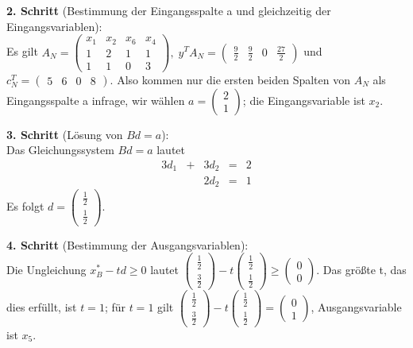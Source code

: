 \documentclass[10pt,a4paper,oneside,ngerman,numbers=noenddot]{scrartcl}
\begin{document}
		\textbf{2. Schritt} (Bestimmung der Eingangsspalte a und gleichzeitig der Eingangsvariablen):\\
		Es gilt $A_{N} = \begin{pmatrix} x_{1} & x_{2} & x_{6} & x_{4} \\ 1 & 2 & 1 & 1 \\ 1 & 1 & 0 & 3 \end{pmatrix},\; y^{T}A_{N} = \begin{pmatrix} \frac{9}{2} & \frac{9}{2} & 0 & \frac{27}{2} \end{pmatrix}$ und $c_{N}^{T} = \begin{pmatrix} 5 & 6 & 0 & 8 \end{pmatrix}$. Also kommen nur die ersten beiden Spalten von $A_{N}$ als Eingangsspalte a infrage, wir wählen $a = \begin{pmatrix} 2 \\ 1 \end{pmatrix}$; die Eingangsvariable ist $x_{2}$.
		
		\textbf{3. Schritt} (Lösung von $Bd = a$):\\
		Das Gleichungssystem $Bd = a$ lautet
		\begin{alignat*}{3}
			d_{1} &+& 3d_{2} &=& 2 \\
			&& 2d_{2} &=& 1
		\end{alignat*}
		Es folgt $d = \begin{pmatrix}\frac{1}{2} \\ \frac{1}{2}\end{pmatrix}$.
		
		\textbf{4. Schritt} (Bestimmung der Ausgangsvariablen):\\
		Die Ungleichung $x_{B}^{*} - td \geq 0$ lautet $\begin{pmatrix} \frac{1}{2} \\ \frac{3}{2}\end{pmatrix} - t \begin{pmatrix}\frac{1}{2} \\ \frac{1}{2} \end{pmatrix} \geq \begin{pmatrix} 0 \\ 0 \end{pmatrix}$. Das größte t, das dies erfüllt, ist $t = 1$; für $t = 1$ gilt $\begin{pmatrix} \frac{1}{2} \\ \frac{3}{2}\end{pmatrix} - t \begin{pmatrix}\frac{1}{2} \\ \frac{1}{2} \end{pmatrix} = \begin{pmatrix} 0 \\ 1 \end{pmatrix}$, Ausgangsvariable ist $x_{5}$.
		
\end{document}
